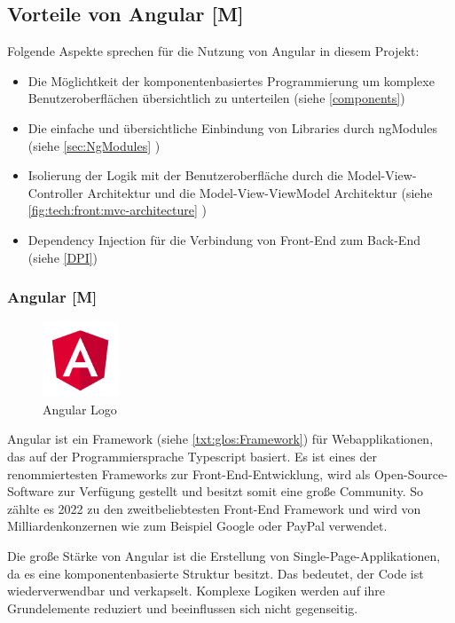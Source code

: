 \subsection{Vorteile von Angular [M]}
Folgende Aspekte sprechen für die Nutzung von Angular in diesem Projekt:

\begin{itemize}
  \item Die Möglichtkeit der komponentenbasiertes Programmierung um komplexe Benutzeroberflächen übersichtlich zu unterteilen (siehe \ref{components}) 
  \item Die einfache und übersichtliche Einbindung von Libraries durch ngModules (siehe \ref{sec:NgModules} )
  \item Isolierung der Logik mit der Benutzeroberfläche durch die Model-View-Controller Architektur und die Model-View-ViewModel Architektur (siehe \ref{fig:tech:front:mvc-architecture} )
  \item 
  Dependency Injection für die Verbindung von Front-End zum Back-End (siehe \ref{DPI})
\end{itemize}

\subsubsection{Angular [M]}
\begin{figure}
  \begin{center}
    \includegraphics[width=0.2\textwidth]{pics/AngularLogo.png}
   \caption{Angular Logo}
  \end{center}
\end{figure}
Angular ist ein Framework (siehe \ref{txt:glos:Framework}) für Webapplikationen, das auf der Programmiersprache Typescript basiert. Es ist eines der renommiertesten Frameworks zur Front-End-Entwicklung, wird als Open-Source-Software zur Verfügung gestellt und besitzt somit eine große Community. So zählte es 2022 zu den zweitbeliebtesten Front-End Framework \cite{AngularEvidence} und wird von Milliardenkonzernen wie zum Beispiel Google oder PayPal verwendet. 
\cite{AngularEvidence2}

Die große Stärke von Angular ist die Erstellung von Single-Page-Applikationen, da es eine komponentenbasierte Struktur besitzt. Das bedeutet, der Code ist wiederverwendbar und verkapselt. Komplexe Logiken werden auf ihre Grundelemente reduziert und beeinflussen sich nicht gegenseitig. \cite{AngularGeneral}


